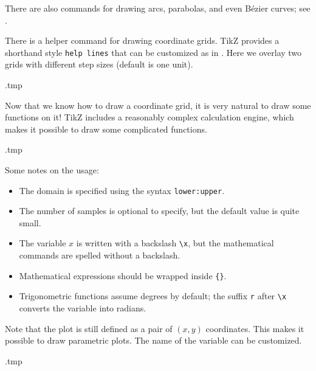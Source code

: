 There are also commands for drawing arcs, parabolas, and even Bézier curves;
see \cite[Section~14]{tikz}.

There is a helper command for drawing coordinate grids.
TikZ provides a shorthand style \verb|help lines|
that can be customized as in .
Here we overlay two grids with different step sizes (default is one unit).
%
\begin{VerbatimOut}{\jobname.tmp}
\centering
{}
\end{VerbatimOut}
\ShowExampleBelow[2]

Now that we know how to draw a coordinate grid,
it is very natural to draw some functions on it!
TikZ includes a reasonably complex calculation engine,
which makes it possible to draw some complicated functions.
%
\begin{VerbatimOut}{\jobname.tmp}
\centering
{}
\end{VerbatimOut}
\ShowExampleBelow[2]
Some notes on the usage:
\begin{itemize}
\item The domain is specified using the syntax \verb|lower:upper|.
\item The number of samples is optional to specify, but the default value is quite small.
\item The variable $x$ is written with a backslash \verb|\x|,
    but the mathematical commands are spelled without a backslash.
\item Mathematical expressions should be wrapped inside \verb|{}|.
\item Trigonometric functions assume degrees by default;
    the suffix \verb|r| after \verb|\x| converts the variable into radians.
\end{itemize}

Note that the plot is still defined as a pair of $(x,y)$ coordinates.
This makes it possible to draw parametric plots.
The name of the variable can be customized.
%
\begin{VerbatimOut}{\jobname.tmp}
\centering
{}
\end{VerbatimOut}
\ShowExampleBelow[2]

